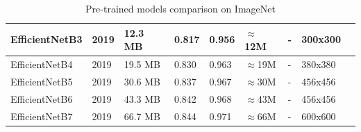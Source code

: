 \begin{table}[h]
\begin{tabularx}{\textwidth}{|l|X|X|X|X|X|X|X|X|}
        	EfficientNetB3 & 2019 & 12.3 MB & 0.817 & 0.956 & $\approx$12M & - & 300x300 \\ \hline
        	EfficientNetB4 & 2019 & 19.5 MB & 0.830 & 0.963 & $\approx$19M & - & 380x380 \\ \hline
        	EfficientNetB5 & 2019 & 30.6 MB & 0.837 & 0.967 & $\approx$30M & - & 456x456 \\ \hline
        	EfficientNetB6 & 2019 & 43.3 MB & 0.842 & 0.968 & $\approx$43M & - & 456x456 \\ \hline
        	EfficientNetB7 & 2019 & 66.7 MB & 0.844 & 0.971 & $\approx$66M & - & 600x600 \\ \hline
        \end{tabularx}
        \caption{Pre-trained models comparison on ImageNet}
        \label{tables:pretrainedmodels}
    \end{table} 


